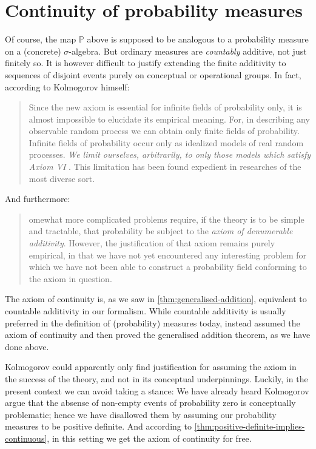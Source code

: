 \documentclass[article, a4paper, 11pt, oneside]{memoir}
\numberwithin{equation}{chapter}
\renewcommand{\P}{\mathbb{P}}
\begin{document}
\section{Continuity of probability measures}

Of course, the map $\P$ above is supposed to be analogous to a probability measure on a (concrete) $\sigma$-algebra. But ordinary measures are \emph{countably} additive, not just finitely so. It is however difficult to justify extending the finite additivity to sequences of disjoint events purely on conceptual or operational groups. In fact, according to Kolmogorov himself:
%
\blockquote[\cite{kolmogorov1956}]{%
    Since the new axiom  is essential for infinite fields of probability only, it is almost impossible to elucidate its empirical meaning. \textelp{} For, in describing any observable random process we can obtain only finite fields of probability. Infinite fields of probability occur only as idealized models of real random processes. \emph{We limit ourselves, arbitrarily, to only those models which satisfy Axiom VI} . This limitation has been found expedient in researches of the most diverse sort.%
}
%
And furthermore:
%
\blockquote[\cite{kolmogorov1995}]{%
    omewhat more complicated problems require, if the theory is to be simple and tractable, that probability be subject to the \emph{axiom of denumerable additivity}. However, the justification of that axiom remains purely empirical, in that we have not yet encountered any interesting problem for which we have not been able to construct a probability field conforming to the axiom in question.%
}
%
The axiom of continuity is, as we saw in \cref{thm:generalised-addition}, equivalent to countable additivity in our formalism. While countable additivity is usually preferred in the definition of (probability) measures today, \textcite{kolmogorov1956} instead assumed the axiom of continuity and then proved the generalised addition theorem, as we have done above.

Kolmogorov could apparently only find justification for assuming the axiom in the success of the theory, and not in its conceptual underpinnings. Luckily, in the present context we can avoid taking a stance: We have already heard Kolmogorov argue that the absense of non-empty events of probability zero is conceptually problematic; hence we have disallowed them by assuming our probability measures to be positive definite. And according to \cref{thm:positive-definite-implies-continuous}, in this setting we get the axiom of continuity for free.
\end{document}
